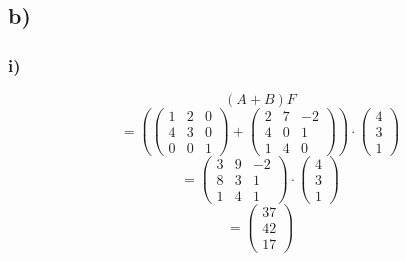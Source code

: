    \subsection{b)}
        \subsubsection{i)}
            $$(A+B)F$$
            $$=(\begin{pmatrix}
                1 & 2 & 0\\
                4 & 3 & 0\\
                0 & 0 & 1
            \end{pmatrix}
            +
            \begin{pmatrix}
                2 & 7 & -2 \\
                4 & 0 & 1 \\
                1 & 4 & 0
            \end{pmatrix}
            )\cdot
            \begin{pmatrix}
                4\\
                3\\
                1
            \end{pmatrix}
            $$
            $$=\begin{pmatrix}
                3 & 9 & -2\\
                8 & 3 & 1\\
                1 & 4 & 1
            \end{pmatrix}
            \cdot
            \begin{pmatrix}
                4\\
                3\\
                1
            \end{pmatrix}$$
            $$=
            \begin{pmatrix}
                37\\
                42\\
                17
            \end{pmatrix}$$


